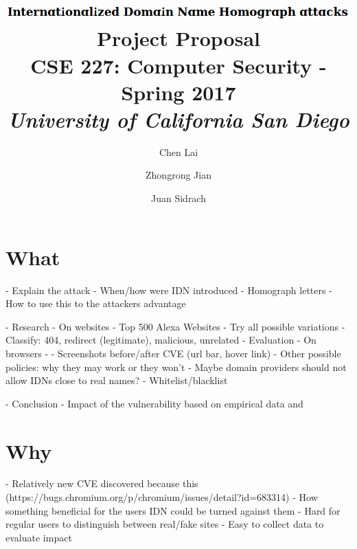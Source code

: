 \documentclass[letterpaper,twocolumn,10pt]{article}
\begin{document}
\date{}

\title{\Large \textbf{
\includegraphics[height=\baselineskip]{title} \\
Project Proposal } \\ \vspace{0.025 in} \large \normalfont
CSE 227: Computer Security - Spring 2017 \\ \textit{
University of California San Diego
}}

\author{
{\rm Chen Lai}\\
\and
{\rm Zhongrong Jian}\\
\and
{\rm Juan Sidrach}\\
}

\maketitle

\section{What}
- Explain the attack
  - When/how were IDN introduced
  - Homograph letters
  - How to use this to the attackers advantage

- Research
  - On websites
    - Top 500 Alexa Websites
    - Try all possible variations
    - Classify: 404, redirect (legitimate), malicious, unrelated
    - Evaluation
  - On browsers
    - %
    - Screenshots before/after CVE (url bar, hover link)
    - Other possible policies: why they may work or they won't
      - Maybe domain providers should not allow IDNs close to real names?
      - Whitelist/blacklist

- Conclusion
  - Impact of the vulnerability based on empirical data and %

\section{Why}
- Relatively new CVE discovered because this (https://bugs.chromium.org/p/chromium/issues/detail?id=683314)
- How something beneficial for the users IDN could be turned against them
- Hard for regular users to distinguish between real/fake sites
- Easy to collect data to evaluate impact
\end{document}
